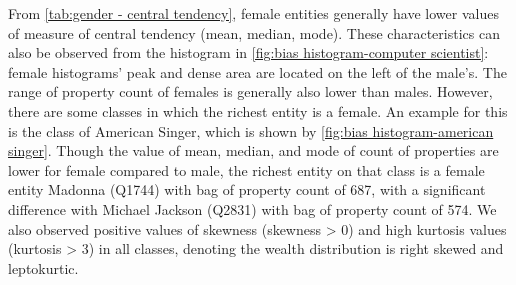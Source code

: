 From \autoref{tab:gender - central tendency}, female entities generally have lower values of measure of central tendency (mean, median, mode). These characteristics can also be observed from the histogram in \autoref{fig:bias histogram-computer scientist}: female histograms’ peak and dense area are located on the left of the male’s. The range of property count of females is generally also lower than males. However, there are some classes in which the richest entity is a female. An example for this is the class of American Singer, which is shown by \autoref{fig:bias histogram-american singer}. Though the value of mean, median, and mode of count of properties are lower for female compared to male, the richest entity on that class is a female entity Madonna (Q1744) with bag of property count of 687, with a significant difference with Michael Jackson (Q2831) with bag of property count of 574. We also observed positive values of skewness (skewness > 0) and high kurtosis values (kurtosis > 3) in all classes, denoting the wealth distribution is right skewed and leptokurtic.

